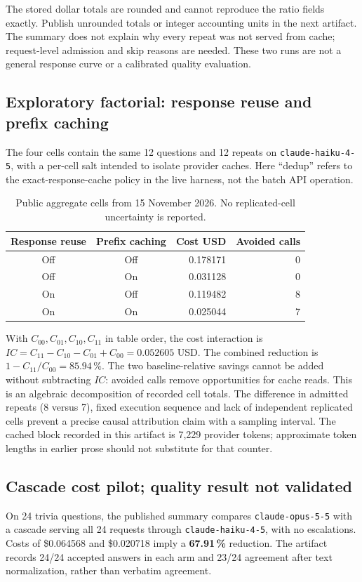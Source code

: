 \documentclass[11pt,a4paper]{article}
\begin{document}
The stored dollar totals are rounded and cannot reproduce the ratio fields exactly. Publish
unrounded totals or integer accounting units in the next artifact. The summary does not explain
why every repeat was not served from cache; request-level admission and skip reasons are needed.
These two runs are not a general response curve or a calibrated quality evaluation.

\subsection{Exploratory factorial: response reuse and prefix caching}
The four cells contain the same 12 questions and 12 repeats on \texttt{claude-haiku-4-5}, with a
per-cell salt intended to isolate provider caches. Here ``dedup'' refers to the
exact-response-cache policy in the live harness, not the batch API operation.

\begin{table}[h]
\centering
\begin{tabular}{ccrr}
\toprule
Response reuse & Prefix caching & Cost USD & Avoided calls \\
\midrule
Off & Off & 0.178171 & 0 \\
Off & On & 0.031128 & 0 \\
On & Off & 0.119482 & 8 \\
On & On & 0.025044 & 7 \\
\bottomrule
\end{tabular}
\caption{Public aggregate cells from 15 November 2026. No replicated-cell uncertainty is
reported.}
\label{tab:factorial}
\end{table}

With $C_{00},C_{01},C_{10},C_{11}$ in table order, the cost interaction is
$IC=C_{11}-C_{10}-C_{01}+C_{00}=0.052605$ USD. The combined reduction is
$1-C_{11}/C_{00}=85.94\,\%$. The two baseline-relative savings cannot be added without
subtracting $IC$: avoided calls remove opportunities for cache reads. This is an algebraic
decomposition of recorded cell totals. The difference in admitted repeats (8 versus 7), fixed
execution sequence and lack of independent replicated cells prevent a precise causal attribution
claim with a sampling interval. The cached block recorded in this artifact is 7{,}229 provider
tokens; approximate token lengths in earlier prose should not substitute for that counter.

\subsection{Cascade cost pilot; quality result not validated}
On 24 trivia questions, the published summary compares \texttt{claude-opus-5-5} with a cascade
serving all 24 requests through \texttt{claude-haiku-4-5}, with no escalations. Costs of
\$0.064568 and \$0.020718 imply a \textbf{67.91\,\%} reduction. The artifact records 24/24
accepted answers in each arm and 23/24 agreement after text normalization, rather than verbatim
agreement.
\end{document}
